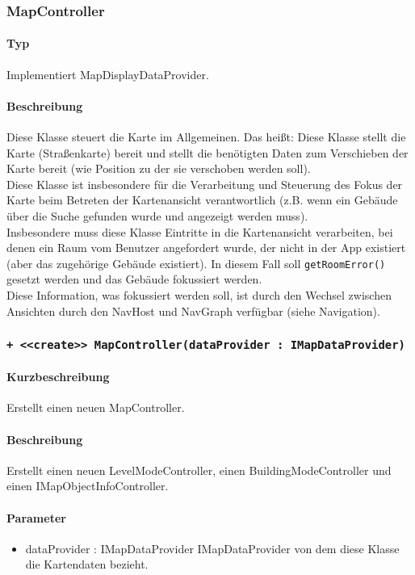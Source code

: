 \subsubsection{MapController}
\paragraph*{Typ}
Implementiert MapDisplayDataProvider.
\paragraph*{Beschreibung}
Diese Klasse steuert die Karte im Allgemeinen. Das heißt: Diese Klasse stellt die Karte (Straßenkarte) bereit 
und stellt die benötigten Daten zum Verschieben der Karte bereit (wie Position zu der sie verschoben werden soll).\\
Diese Klasse ist insbesondere für die Verarbeitung und Steuerung des Fokus der Karte beim Betreten der 
Kartenansicht verantwortlich (z.B. wenn ein Gebäude über die Suche gefunden wurde und angezeigt werden muss).\\
Insbesondere muss diese Klasse Eintritte in die Kartenansicht verarbeiten, bei denen ein Raum vom Benutzer angefordert wurde, 
der nicht in der App existiert (aber das zugehörige Gebäude existiert). In diesem Fall soll \texttt{getRoomError()} gesetzt 
werden und das Gebäude fokussiert werden.\\
Diese Information, was fokussiert werden soll, ist durch den Wechsel zwischen Ansichten durch den NavHost und NavGraph verfügbar (siehe Navigation).

\subsubsection*{\texttt{+ <<create>> MapController(dataProvider : IMapDataProvider)}}%
\paragraph*{Kurzbeschreibung}
Erstellt einen neuen MapController.
\paragraph*{Beschreibung}
Erstellt einen neuen LevelModeController, einen BuildingModeController und einen IMapObjectInfoController.
\paragraph*{Parameter}
\begin{itemize}
    \item dataProvider : IMapDataProvider IMapDataProvider von dem diese Klasse die Kartendaten bezieht.
\end{itemize}
